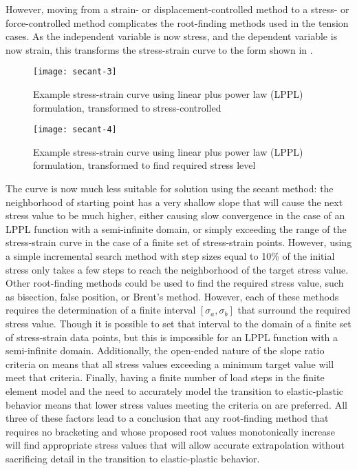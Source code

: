 However, moving from a strain- or displacement-controlled method to a stress- or force-controlled method complicates the root-finding methods used in the tension cases.
As the independent variable is now stress, and the dependent variable is now strain, this transforms the stress-strain curve to the form shown in .
\begin{figure}[tbp]
\centering
\texttt{[image: secant-3]}
\caption{\label{fig:secant-3}Example stress-strain curve using linear plus power law (LPPL) formulation, transformed to stress-controlled}
\end{figure}
\begin{figure}[tbp]
\centering
\texttt{[image: secant-4]}
\caption{\label{fig:secant-4}Example stress-strain curve using linear plus power law (LPPL) formulation, transformed to find required stress level}
\end{figure}
The curve is now much less suitable for solution using the secant method: the neighborhood of starting point has a very shallow slope that will cause the next stress value to be much higher, either causing slow convergence in the case of an LPPL function with a semi-infinite domain, or simply exceeding the range of the stress-strain curve in the case of a finite set of stress-strain points.
However, using a simple incremental search method with step sizes equal to 10\% of the initial stress only takes a few steps to reach the neighborhood of the target stress value.
Other root-finding methods could be used to find the required stress value, such as bisection, false position, or Brent's method.
However, each of these methods requires the determination of a finite interval \([\sigma_a, \sigma_b]\) that surround the required stress value.
Though it is possible to set that interval to the domain of a finite set of stress-strain data points, but this is impossible for an LPPL function with a semi-infinite domain.
Additionally, the open-ended nature of the slope ratio criteria on  means that all stress values exceeding a minimum target value will meet that criteria.
Finally, having a finite number of load steps in the finite element model and the need to accurately model the transition to elastic-plastic behavior means that lower stress values meeting the criteria on  are preferred.
All three of these factors lead to a conclusion that any root-finding method that requires no bracketing and whose proposed root values monotonically increase will find appropriate stress values that will allow accurate extrapolation without sacrificing detail in the transition to elastic-plastic behavior.
